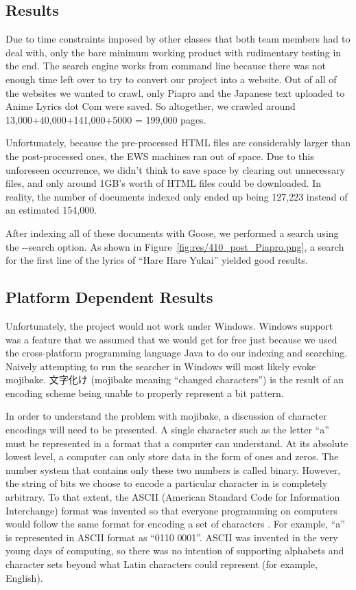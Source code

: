 \documentclass{acm} %
\begin{document}
\begin{CJK}{UTF8}{zhsong}
\section{Results}

Due to time constraints imposed by other classes that both team members had to deal with, only the bare minimum working product with rudimentary testing in the end. The search engine works from command line because there was not enough time left over to try to convert our project into a website. Out of all of the websites we wanted to crawl, only Piapro and the Japanese text uploaded to Anime Lyrics dot Com were saved. So altogether, we crawled around 13,000+40,000+141,000+5000 = 199,000 pages.

Unfortunately, because the pre-processed HTML files are considerably larger than the post-processed ones, the EWS machines ran out of space. Due to this unforeseen occurrence, we didn't think to save space by clearing out unnecessary files, and only around 1GB's worth of HTML files could be downloaded. In reality, the number of documents indexed only ended up being 127,223 instead of an estimated 154,000.

After indexing all of these documents with Goose, we performed a search using the -{}-search option. As shown in Figure~\ref{fig:res/410_post_Piapro.png}, a search for the first line of the lyrics of ``Hare Hare Yukai'' yielded good results.


\pagebreak
\subsection{Platform Dependent Results}

Unfortunately, the project would not work under Windows. Windows support was a feature that we assumed that we would get for free just because we used the cross-platform programming language Java to do our indexing and searching. Naively attempting to run the searcher in Windows will most likely evoke mojibake. 文字化け (mojibake meaning ``changed characters'') is the result of an encoding scheme being unable to properly represent a bit pattern.

In order to understand the problem with mojibake, a discussion of character encodings will need to be presented. A single character such as the letter ``a'' must be represented in a format that a computer can understand. At its absolute lowest level, a computer can only store data in the form of ones and zeros. The number system that contains only these two numbers is called binary. However, the string of bits we choose to encode a particular character in is completely arbitrary. To that extent, the ASCII (American Standard Code for Information Interchange) format was invented so that everyone programming on computers would follow the same format for encoding a set of characters \cite[p.~1]{ascii}. For example, ``a'' is represented in ASCII format as ``0110 0001''. ASCII was invented in the very young days of computing, so there was no intention of supporting alphabets and character sets beyond what Latin characters could represent (for example, English).


\end{CJK}
\end{document}
